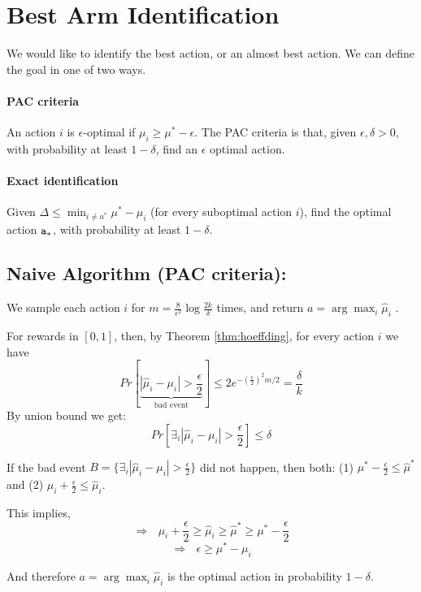 \section{Best Arm Identification}

We would like to identify the best action, or an almost best action.
We can define the goal in one of two ways.

\paragraph{PAC criteria }
An action $i$ is $\epsilon$-optimal if  $\mu_i\geq \mu^*-\epsilon$. The PAC criteria is
that, given $\epsilon,\delta>0$, with probability at least
$1-\delta$, find an $\epsilon$ optimal action.

\paragraph{Exact identification}
Given $\Delta\le\min_{i\neq a^*}\mu^{*}-\mu_{i}$ (for every suboptimal action $i$),
find the optimal action ${\tt a}_{*}$, with probability at least
$1-\delta$.

\subsection{Naive Algorithm (PAC criteria):}

We sample each action $i$ for
$m=\frac{8}{\epsilon^{2}}\log\frac{2k}{\delta}$ times, and return
$a= \arg\max_{i}\hat{\mu}_{i}$ .

For rewards in $[ 0 ,1]$, then, by Theorem \ref{thm:hoeffding}, for
every action $i$ we have
\[
Pr\left[\underbrace{\left|\hat{\mu}_{i}-\mu_{i}\right|>\frac{\epsilon}{2}}_{\text{bad
event}}\right]\le 2
e^{-\left(\frac{\epsilon}{2}\right)^{2}m/2}=\frac{\delta}{k}
\]
By union bound we get:
\[
Pr\left[\exists_{i}\left|\hat{\mu}_{i}-\mu_{i}\right|>\frac{\epsilon}{2}\right]\le\delta
\]

If the bad event
$B=\{\exists_{i}\left|\hat{\mu}_{i}-\mu_{i}\right|>\frac{\epsilon}{2}\}$
did not happen, then both: (1)
$\mu^{*}-\frac{\epsilon}{2}\le\hat{\mu}^{*}$ and (2)
$\mu_{i}+\frac{\epsilon}{2}\le\hat{\mu}_{i}$.

This implies,
\[
\Rightarrow\text{ }\mu_{i}+\frac{\epsilon}{2}\ge\hat{\mu}_{i}\ge\hat{\mu}^{*}\ge\mu^{*}-\frac{\epsilon}{2}
\]
\[
\Rightarrow\text{ }\epsilon\ge\mu^{*}-\mu_{i}
\]

And therefore $a={\displaystyle \arg\max_{i}\hat{\mu}_{i}}$ is the
optimal action in probability $1-\delta$.

